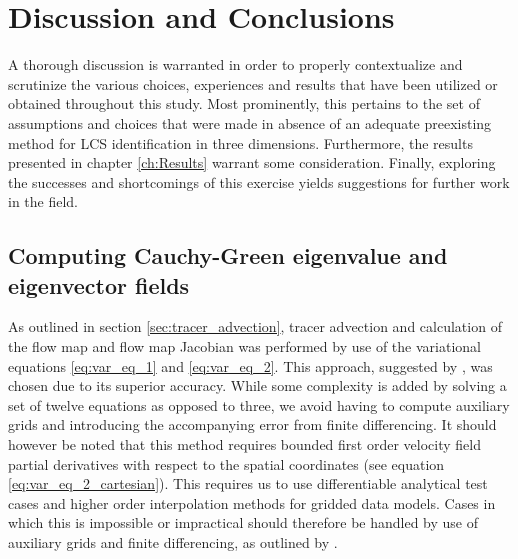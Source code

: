 \chapter[Discussion and Conclusions]{Discussion and Conclusions}

A thorough discussion is warranted in order to properly contextualize and scrutinize  the various choices, experiences and results that have been utilized or obtained throughout this study. Most prominently, this pertains to the set of assumptions and choices that were made in absence of an adequate preexisting method for LCS identification in three dimensions. Furthermore, the results presented in chapter \ref{ch:Results} warrant some consideration. Finally, exploring the successes and shortcomings of this exercise yields suggestions for further work in the field.

\section{Computing Cauchy-Green eigenvalue and eigenvector fields}\label{sec:discussion_eigen}

As outlined in section \ref{sec:tracer_advection}, tracer advection and calculation of the flow map and flow map Jacobian was performed by use of the variational equations \eqref{eq:var_eq_1} and \eqref{eq:var_eq_2}. This approach, suggested by \cite{Oettinger}, was chosen due to its superior accuracy. While some complexity is added by solving a set of twelve equations as opposed to three, we avoid having to compute auxiliary grids \citep{Haller12} and introducing the accompanying error from finite differencing. It should however be noted that this method requires bounded first order velocity field partial derivatives with respect to the spatial coordinates (see equation \eqref{eq:var_eq_2_cartesian}). This requires us to use
differentiable analytical test cases and higher order interpolation methods for gridded data models. Cases in which this is impossible or impractical should therefore be handled by use of auxiliary grids and finite differencing, as outlined by \cite{Haller12}.

